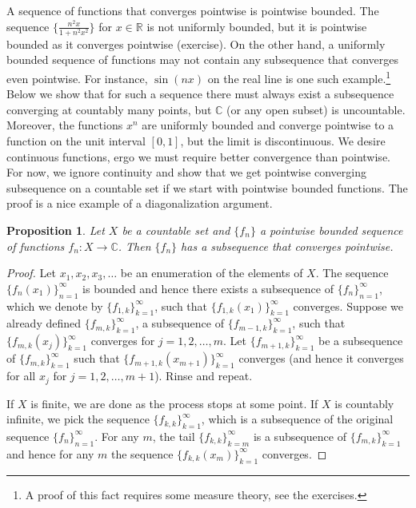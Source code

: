 \documentclass[12pt,openany]{book}
\newcommand{\C}{{\mathbb{C}}}
\newcommand{\R}{{\mathbb{R}}}
\theoremstyle{plain}
\newtheorem{prop}[thm]{Proposition}
\theoremstyle{remark}
\theoremstyle{definition}
\theoremstyle{exercise}
\theoremstyle{example}
\begin{document}
A sequence of functions that converges pointwise is pointwise bounded.
The sequence $\bigl\{ \frac{n^2x}{1+n^2x^2} \bigr\}$
for $x \in \R$
is not uniformly bounded, but it is pointwise bounded as it converges
pointwise (exercise).
On the other hand,
a uniformly bounded sequence of functions may
not contain any subsequence that converges even pointwise.
For instance, $\sin(nx)$ on the real line is one such example.\footnote{%
A proof of this fact requires some measure theory, see the exercises.}
Below we show that for such a sequence there must always exist
a subsequence converging at countably
many points, but $\C$ (or any open subset) is uncountable.
Moreover,
the functions $x^n$ are uniformly bounded
and converge pointwise to a function on the unit interval $[0,1]$, but the limit
is discontinuous.  We desire continuous
functions, ergo we must require better convergence than pointwise.  For now,
we ignore continuity and show that we get pointwise
converging subsequence on a countable set
if we start with pointwise bounded functions.
The proof is a nice example of a diagonalization argument.

\begin{prop} \label{prop:subsequenceoncountableX}
Let $X$ be a countable set and $\{ f_n \}$ a pointwise bounded
sequence of functions $f_n \colon X \to \C$.
Then $\{ f_n \}$ has a subsequence that converges pointwise.
\end{prop}

\begin{proof}
Let $x_1,x_2,x_3,\ldots$ be an enumeration of the elements of $X$.
The sequence $\{ f_n(x_1) \}_{n=1}^\infty$ is bounded and hence
there exists a subsequence of $\{ f_n \}_{n=1}^{\infty}$, which we denote by
$\{ f_{1,k} \}_{k=1}^\infty$,
such that
$\{ f_{1,k}(x_1) \}_{k=1}^\infty$ converges.
Suppose we already defined $\{ f_{m,k} \}_{k=1}^\infty$,
a subsequence of $\{ f_{m-1,k} \}_{k=1}^\infty$,
such that
$\{ f_{m,k}(x_j) \}_{k=1}^\infty$ converges for $j=1,2,\ldots,m$.
Let $\{ f_{m+1,k} \}_{k=1}^\infty$ be a subsequence of
$\{ f_{m,k} \}_{k=1}^\infty$
such that
$\{ f_{m+1,k}(x_{m+1}) \}_{k=1}^\infty$ converges (and hence it converges for all
$x_j$ for $j=1,2,\ldots,m+1$).  Rinse and repeat.

If $X$ is finite, we are done as the process stops at some point.
If $X$ is countably infinite,
we pick the sequence
$\{ f_{k,k} \}_{k=1}^\infty$,
which is a subsequence of the original sequence $\{ f_n \}_{n=1}^\infty$.
For any $m$, the tail $\{ f_{k,k} \}_{k=m}^\infty$ is a subsequence of $\{ f_{m,k}
\}_{k=1}^\infty$
and hence for any $m$ the sequence $\{ f_{k,k}(x_m) \}_{k=1}^\infty$ converges.
\end{proof}
\end{document}
